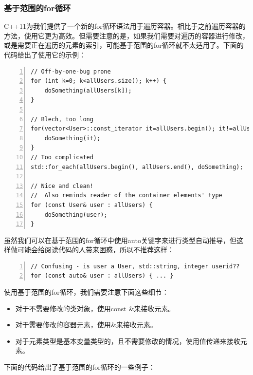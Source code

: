 \documentclass{ctexart}
\begin{document}
\subsubsection{基于范围的for循环}

C++11为我们提供了一个新的for循环语法用于遍历容器。相比于之前遍历容器的方法，使用它更为高效。但需要注意的是，如果我们需要对遍历的容器进行修改，或是需要正在遍历的元素的索引，可能基于范围的for循环就不太适用了。下面的代码给出了使用它的示例：

\begin{lstlisting}[language={[ANSI]C},keywordstyle=\color{blue!70},commentstyle=\color{red!50!green!50!blue!50},frame=shadowbox, rulesepcolor=\color{red!20!green!20!blue!20},basicstyle=\small,numbers=left, numberstyle=\tiny,breaklines=true]
// Off-by-one-bug prone
for (int k=0; k<allUsers.size(); k++) {
	doSomething(allUsers[k]);
}  

// Blech, too long
for(vector<User>::const_iterator it=allUsers.begin(); it!=allUsers.end(); it++){
	doSomething(it);
}
// Too complicated
std::for_each(allUsers.begin(), allUsers.end(), doSomething);

// Nice and clean!
//  Also reminds reader of the container elements' type
for (const User& user : allUsers) {
	doSomething(user);
}
\end{lstlisting}

虽然我们可以在基于范围的for循环中使用auto关键字来进行类型自动推导，但这样做可能会给阅读代码的人带来困惑，所以不推荐这样：

\begin{lstlisting}[language={[ANSI]C},keywordstyle=\color{blue!70},commentstyle=\color{red!50!green!50!blue!50},frame=shadowbox, rulesepcolor=\color{red!20!green!20!blue!20},basicstyle=\small,numbers=left, numberstyle=\tiny,breaklines=true]
// Confusing - is user a User, std::string, integer userid??
for (const auto& user : allUsers) { ... }
\end{lstlisting}

使用基于范围的for循环，我们需要注意下面这些细节：

\begin{itemize}
	\item 对于不需要修改的类对象，使用const \&来接收元素。
	\item 对于需要修改的容器元素，使用\&来接收元素。
	\item 对于元素类型是基本变量类型的，且不需要修改的情况，使用值传递来接收元素。
\end{itemize}

下面的代码给出了基于范围的for循环的一些例子：
\end{document}
